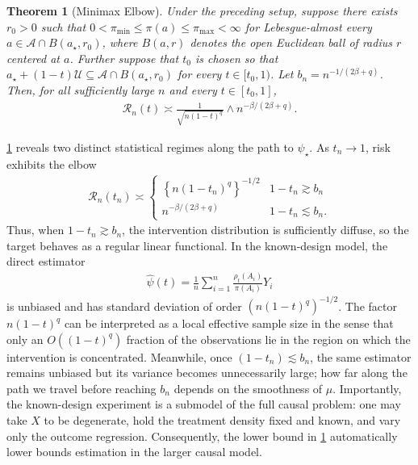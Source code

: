 \documentclass[11pt,twoside]{article}
\newtheorem{theorem}{Theorem}
\theoremstyle{definition}
\theoremstyle{remark}
\begin{document}
\begin{theorem}[Minimax Elbow]
\label{minimax_elbow}
Under the preceding setup, suppose there exists $r_0>0$ such that $0<\pi_{\min} \leq \pi(a) \leq \pi_{\max} <\infty$ for Lebesgue-almost every $a\in\mathcal{A}\cap B(a_\star,r_0)$, where $B(a, r)$ denotes the open Euclidean ball of radius $r$ centered at $a$. Further suppose that $t_0$ is chosen so that $a_\star+(1-t)\mathcal{U} \subseteq \mathcal{A}\cap B(a_\star,r_0)$ for every $t\in[t_0,1)$. Let $b_n=n^{-1/(2\beta+q)}$. Then, for all sufficiently large $n$ and every $t\in[t_0,1]$,
\begin{align*} 
\mathcal{R}_n(t)
\asymp
\frac{1}{\sqrt{n(1-t)^q}}
\wedge
n^{-\beta/(2\beta+q)}.
\end{align*}
\end{theorem}

\cref{minimax_elbow} reveals two distinct statistical regimes along the path to $\psi_\star$. As $t_n \to 1$, risk exhibits the elbow
\begin{align*}
\mathcal{R}_n(t_n) \asymp
\begin{cases}
\left\{n(1-t_n)^q\right\}^{-1/2}
& 1-t_n\gtrsim b_n \\[0.05in]
n^{-\beta/(2\beta+q)}
& 1-t_n\lesssim b_n.
\end{cases}
\end{align*}
Thus, when $1 - t_n \gtrsim b_n$, the intervention distribution is sufficiently diffuse, so the target behaves as a regular linear functional. In the known-design model, the direct estimator
\begin{align*}
    \widehat{\psi}(t) = \frac{1}{n}\sum_{i=1}^n \frac{\rho_t(A_i)}{\pi(A_i)}Y_i
\end{align*}
is unbiased and has standard deviation of order $(n(1-t)^q)^{-1/2}$. The factor $n(1-t)^q$ can be interpreted as a local effective sample size in the sense that only an $O((1-t)^q)$ fraction of the observations lie in the region on which the intervention is concentrated. Meanwhile, once $(1-t_n) \lesssim b_n$, the same estimator remains unbiased but its variance becomes unnecessarily large; how far along the path we travel before reaching $b_n$ depends on the smoothness of $\mu$. Importantly, the known-design experiment is a submodel of the full causal problem: one may take $X$ to be degenerate, hold the treatment density fixed and known, and vary only the outcome regression. Consequently, the lower bound in \cref{minimax_elbow} automatically lower bounds estimation in the larger causal model. 
\end{document}
